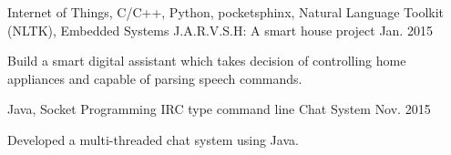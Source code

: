 \begin{cventries}
    \cventry
    {Internet of Things, C/C++, Python, pocketsphinx, Natural Language Toolkit (NLTK), Embedded Systems}
    {J.A.R.V.S.H: A smart house project}
    {}
    {Jan. 2015}
    {
      \begin{cvitems}
        \item {Build a smart digital assistant which takes decision of controlling home appliances and capable of parsing speech commands.}
      \end{cvitems}
    }
    \cventry
    {Java, Socket Programming}
    {IRC type command line Chat System}
    {}
    {Nov. 2015}
    {
      \begin{cvitems}
        \item {Developed a multi-threaded chat system using Java.}
      \end{cvitems}
    }
\end{cventries}
